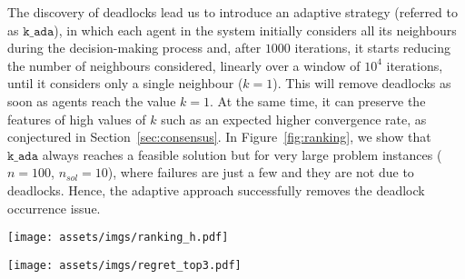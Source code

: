 The discovery of deadlocks lead us to introduce an adaptive strategy (referred to as $\texttt{k\_ada}$), in which each agent in the system initially considers all its neighbours during the decision-making process and, after $1000$ iterations, it starts reducing the number of neighbours considered, linearly over a window of $10^4$ iterations, until it considers only a single neighbour ($k=1$).
This will remove deadlocks as soon as agents reach the value $k=1$. At the same time, it can preserve the features of high values of $k$ such as an expected higher convergence rate, as conjectured in Section~\ref{sec:consensus}. In Figure~\ref{fig:ranking}, we show that $\texttt{k\_ada}$ always reaches a feasible solution but for very large problem instances ($n=100$, $n_{sol}=10$), where failures are just a few and they are not due to deadlocks. Hence, the adaptive approach successfully removes the deadlock occurrence issue.

\begin{figure*}[!t]
    \centering
    \texttt{[image: assets/imgs/ranking\_h.pdf]}
    \caption{Ranking of the solutions given by our algorithm. Data are grouped by the type of agent, by number of agents $n$ and by minimum number of solutions $n_{sol}$ we require the problem instance to have. Bars with label ``$1$'' represent the fraction of executions that converged to an optimal solution. Bars with label ``$\geq 10$'' represent the fraction of executions that converged to a solution in position greater than 10 in the ranking. Bars with label ``Fail'' represent the fraction of executions that exceeded the upper bound of $10^5$ iterations.}
    \label{fig:ranking}
\end{figure*}

\begin{figure*}[!t]
    \centering
    \texttt{[image: assets/imgs/regret\_top3.pdf]}
    \caption{Top: Regret (percentage loss from the optimal solution value) of the solutions given by our algorithm in position 2 or 3 of the ranking. Data are grouped by type of agent, by number of agents $n$ and by minimum number of solutions $n_{sol}$ we require the problem instance to have.
    Bottom: Average convergence rate to a top-3 solution.}
    \label{fig:regret}
\end{figure*}

